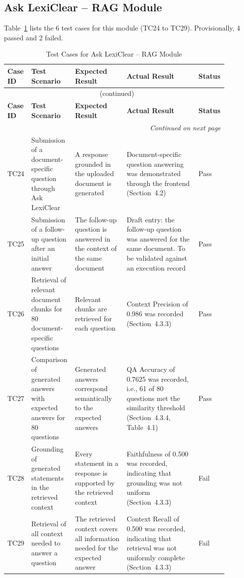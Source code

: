\documentclass[12pt,a4paper,oneside]{report}
\begin{document}
\subsection{Ask LexiClear -- RAG Module}
Table~\ref{tab:rag} lists the 6 test cases for this module (TC24 to TC29). Provisionally, 4 passed and 2 failed.
{\footnotesize
\setlength{\tabcolsep}{3pt}
\renewcommand{\arraystretch}{1.15}
\begin{longtable}{|p{0.075\linewidth}|p{0.19\linewidth}|p{0.23\linewidth}|p{0.32\linewidth}|p{0.08\linewidth}|}
\caption{Test Cases for Ask LexiClear -- RAG Module}\label{tab:rag}\\
\hline
\textbf{Case ID} & \textbf{Test Scenario} & \textbf{Expected Result} & \textbf{Actual Result} & \textbf{Status}\\
\hline
\endfirsthead
\multicolumn{5}{c}{\tablename~\thetable{} (continued)}\\
\hline
\textbf{Case ID} & \textbf{Test Scenario} & \textbf{Expected Result} & \textbf{Actual Result} & \textbf{Status}\\
\hline
\endhead
\hline
\multicolumn{5}{r}{\emph{Continued on next page}}\\
\endfoot
\hline
\endlastfoot
TC24 & Submission of a document-specific question through Ask LexiClear & A response grounded in the uploaded document is generated & Document-specific question answering was demonstrated through the frontend (Section~4.2) & Pass\\
\hline
TC25 & Submission of a follow-up question after an initial answer & The follow-up question is answered in the context of the same document & Draft entry: the follow-up question was answered for the same document. To be validated against an execution record & Pass\\
\hline
TC26 & Retrieval of relevant document chunks for 80 document-specific questions & Relevant chunks are retrieved for each question & Context Precision of 0.986 was recorded (Section~4.3.3) & Pass\\
\hline
TC27 & Comparison of generated answers with expected answers for 80 questions & Generated answers correspond semantically to the expected answers & QA Accuracy of 0.7625 was recorded, i.e., 61 of 80 questions met the similarity threshold (Section~4.3.4, Table~4.1) & Pass\\
\hline
TC28 & Grounding of generated statements in the retrieved context & Every statement in a response is supported by the retrieved context & Faithfulness of 0.500 was recorded, indicating that grounding was not uniform (Section~4.3.3) & Fail\\
\hline
TC29 & Retrieval of all context needed to answer a question & The retrieved context covers all information needed for the expected answer & Context Recall of 0.500 was recorded, indicating that retrieval was not uniformly complete (Section~4.3.3) & Fail\\
\end{longtable}
}
\end{document}
